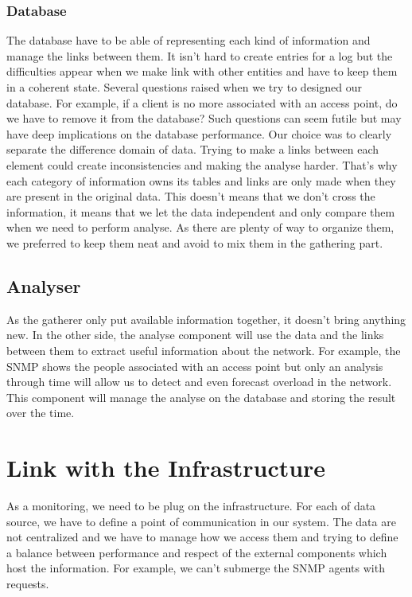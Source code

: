 \subsubsection{Database}
The database have to be able of representing each kind of information and manage the links between them. It isn't hard to create entries for a log but the difficulties appear when we make link with other entities and have to keep them in a coherent state. Several questions raised when we try to designed our database. For example, if a client is no more associated with an access point, do we have to remove it from the database? Such questions can seem futile but may have deep implications on the database performance. Our choice was to clearly separate the difference domain of data. Trying to make a links between each element could create inconsistencies and making the analyse harder. That's why each category of information owns its tables and links are only made when they are present in the original data. This doesn't means that we don't cross the information, it means that we let the data independent and only compare them when we need to perform analyse. As there are plenty of way to organize them, we preferred to keep them neat and avoid to mix them in the gathering part.

\subsection{Analyser}
As the gatherer only put available information together, it doesn't bring anything new. In the other side, the analyse component will use the data and the links between them to extract useful information about the network. For example, the SNMP shows the people associated with an access point but only an analysis through time will allow us to detect and even forecast overload in the network. This component will manage the analyse on the database and storing the result over the time.

\section{Link with the Infrastructure}
As a monitoring, we need to be plug on the infrastructure. For each of data source, we have to define a point of communication in our system. The data are not centralized and we have to manage how we access them and trying to define a balance between performance and respect of the external components which host the information. For example, we can't submerge the SNMP agents with requests.

